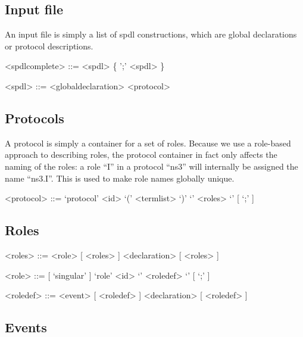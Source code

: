 \documentclass{book}
\begin{document}
\subsection{Input file}

An input file is simply a list of spdl constructions, which are global
declarations or protocol descriptions.

\begin{grammar}

<spdlcomplete>	::= <spdl> \{ ';' <spdl> \}

<spdl>		::=  <globaldeclaration>
		\alt <protocol>

\end{grammar}

\subsection{Protocols}

A protocol is simply a container for a set of roles. Because
we use a role-based approach to describing roles, the protocol container
in fact only affects the
naming of the roles: a role ``I'' in a protocol ``ns3'' will internally be assigned the
name ``ns3.I''. This is used to make role names globally unique.

\begin{grammar}

<protocol>	::= `protocol' <id> `(' <termlist> `)' `{' <roles> `}' [ `;' ]

\end{grammar}

\subsection{Roles}

\begin{grammar}

<roles>		::= <role> [ <roles> ]
		\alt <declaration> [ <roles> ]

<role>		::= [ `singular' ] `role' <id> `{' <roledef> `}' [ `;' ]

<roledef>	::= <event> [ <roledef> ]
		\alt <declaration> [ <roledef> ]

\end{grammar}

\subsection{Events}
\end{document}
